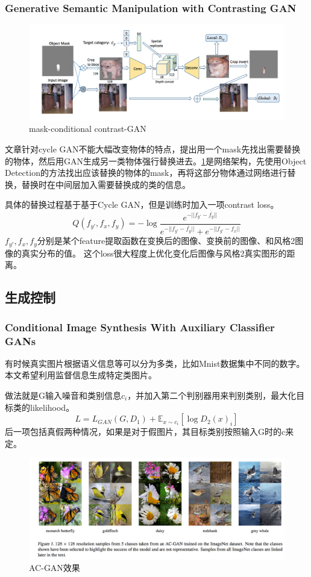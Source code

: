 \documentclass[a4paper]{article}
\begin{document}
\subsubsection{Generative Semantic Manipulation with Contrasting GAN\cite{semantic_replace}}
\begin{figure}
\centering
\includegraphics[width=\textwidth]{./img/37.png}
\caption{mask-conditional contrast-GAN}
\label{fig:37}\end{figure}
文章针对cycle GAN不能大幅改变物体的特点，提出用一个mask先找出需要替换的物体，然后用GAN生成另一类物体强行替换进去。\ref{fig:37}是网络架构，先使用Object Detection的方法找出应该替换的物体的mask，再将这部分物体通过网络进行替换，替换时在中间层加入需要替换成的类的信息。

具体的替换过程基于基于Cycle GAN，但是训练时加入一项contrast loss。
$$Q(f_{y'},f_x,f_y)=-\log \frac{e^{-||f_{y'}-\overline{f_y}||}}
{e^{-||f_{y'}-\overline{f_y}||} + e^{-||f_{y'}-f_x||}}$$
$f_{y'},f_x,f_y$分别是某个feature提取函数在变换后的图像、变换前的图像、和风格2图像的真实分布的值。
这个loss很大程度上优化变化后图像与风格2真实图形的距离。
\subsection{生成控制}
\subsubsection{Conditional Image Synthesis With Auxiliary Classifier GANs\cite{DBLP:journals/corr/OdenaOS16}}
有时候真实图片根据语义信息等可以分为多类，比如Mnist数据集中不同的数字。本文希望利用监督信息生成特定类图片。

做法就是G输入噪音和类别信息$c_i$，并加入第二个判别器用来判别类别，最大化目标类的likelihood。
$$L = L_{GAN}(G,D_1) + \mathbb{E}_{x\sim c_i}[\log D_2(x)_i]$$
后一项包括真假两种情况，如果是对于假图片，其目标类别按照输入G时的c来定。
\begin{figure}
\centering
\includegraphics[width=\textwidth]{./img/14.png}
\caption{AC-GAN效果}
\label{fig:14}
\end{figure}
\end{document}
